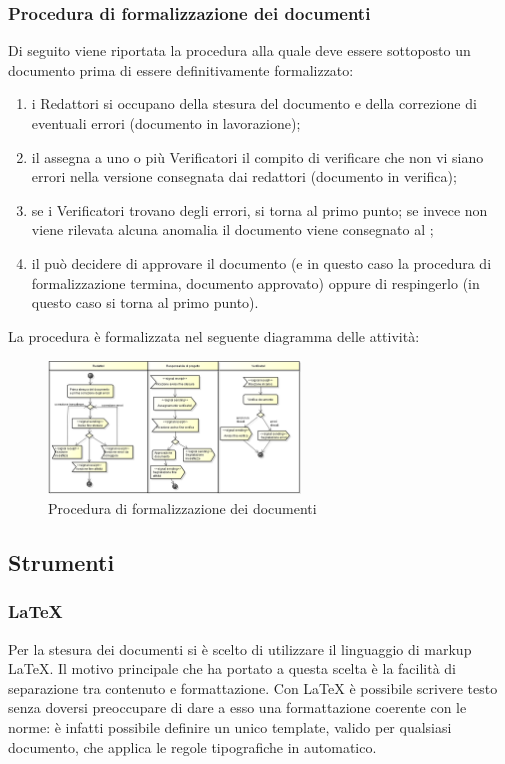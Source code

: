 		\subsubsection{Procedura di formalizzazione dei documenti}
			Di seguito viene riportata la procedura alla quale deve essere sottoposto un documento prima di essere definitivamente formalizzato:
			\begin{enumerate}
				\item i Redattori si occupano della stesura del documento e della correzione di eventuali errori (documento in lavorazione);
				\item il  assegna a uno o più Verificatori il compito di verificare che non vi siano errori nella versione consegnata dai redattori (documento in verifica);
				\item se i Verificatori trovano degli errori, si torna al primo punto; se invece non viene rilevata alcuna anomalia il documento viene consegnato al ;
				\item il  può decidere di approvare il documento (e in questo caso la procedura di formalizzazione termina, documento approvato) oppure di respingerlo (in questo caso si torna al primo punto).
			\end{enumerate}
			La procedura è formalizzata nel seguente diagramma delle attività:
			\begin{figure}[H]
					\centering
					\includegraphics[width=0.6\textwidth]{NormeDiProgetto/Pics/FormalizzazioneDocumenti}
					\caption{Procedura di formalizzazione dei documenti}
				\end{figure}
	\subsection{Strumenti}
		\subsubsection{\LaTeX{}}
			Per la stesura dei documenti si è scelto di utilizzare il linguaggio di markup \LaTeX{}.  Il motivo principale che ha portato a questa scelta è la facilità di separazione tra contenuto e formattazione. Con \LaTeX{} è possibile scrivere testo senza doversi preoccupare di dare a esso una formattazione coerente con le norme: è infatti possibile definire un unico template, valido per qualsiasi documento, che applica le regole tipografiche in automatico.
